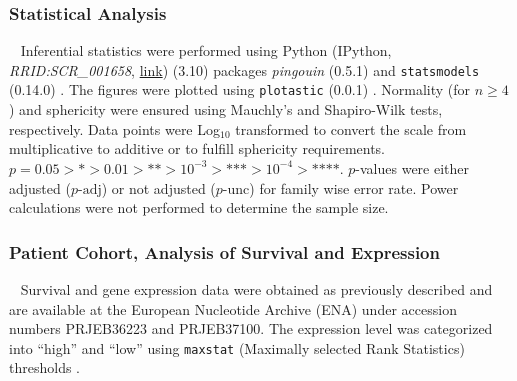 \subsubsection*{Statistical Analysis}
\ %
Inferential statistics were performed using Python (IPython,
\textit{RRID:SCR\_001658},
\href{https://www.ncbi.nlm.nih.gov/sra?term=SCR_001658}{link}) (3.10) packages
\textit{pingouin} (0.5.1) and \texttt{statsmodels} (0.14.0)
\cite{vallatPingouinStatisticsPython2018,seaboldStatsmodelsEconometricStatistical2010}.
The figures were plotted using \texttt{plotastic} (0.0.1)
\cite{kuricPlotasticBridgingPlotting2024}. Normality (for \( n \geq 4 \)) and
sphericity were ensured using Mauchly’s and Shapiro-Wilk tests, respectively.
Data points were Log\(_{10}\) transformed to convert the scale from
multiplicative to additive or to fulfill sphericity requirements. \( p = 0.05 >
\text{*} > 0.01 > \text{**} > 10^{-3} > \text{***}> 10^{-4} > \text{****} \).
$p$-values were either adjusted (\( p{\text{-adj}} \)) or not adjusted (\(
p{\text{-unc}} \)) for family wise error rate. Power calculations were not
performed to determine the sample size.



\subsubsection*{Patient Cohort, Analysis of Survival and Expression}
\ %
Survival and gene expression data were obtained as previously described
\cite{seckingerTargetExpressionGeneration2017b,seckingerCD38ImmunotherapeuticTarget2018}
and are available at the European Nucleotide Archive (ENA) under accession
numbers PRJEB36223 and PRJEB37100. The expression level was categorized into
``high'' and ``low'' using \texttt{maxstat} (Maximally selected Rank Statistics)
thresholds \cite{hothornMaximallySelectedRank}.

